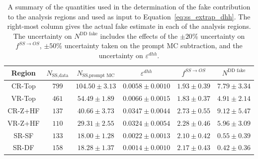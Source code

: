 \begin{table}[!htb]
    \begin{center}
    \caption{
        A summary of the quantities used in the determination of the fake contribution to the
        analysis regions and used as input to Equation~\ref{eq:ss_extrap_dhh}. The right-most
        column gives the actual fake estimate in each of the analysis regions. The uncertainty
        on $N^{\text{DD fake}}$ includes the effects of the $\pm20$\% uncertainty on
        $f^{SS \rightarrow OS}$, $\pm50$\% uncertainty taken on the prompt MC subtraction, and the
        uncertainty on $\varepsilon^{dhh}$.
    }
    \label{tab:hh_fake_quant}
    \begin{tabular}{c | c c c c || c}
    \hline
    \textbf{Region} & \textbf{$N_{\text{SS,data}}$} & \textbf{$N_{\text{SS,prompt MC}}$} & \textbf{$\varepsilon^{dhh}$} & \textbf{$f^{SS \rightarrow OS}$} & \textbf{$N^{\text{DD fake}} $} \\
    \hline
    CR-Top  & $799$ & $104.50 \pm 3.13$ & $ 0.0058 \pm 0.0010$ & $1.93 \pm 0.39$   & $7.79 \pm 3.34$ \\
    VR-Top  & $461$ & $54.49 \pm 1.89$  & $ 0.0066 \pm 0.0015$ & $1.83 \pm 0.37$   &  $4.91 \pm 2.14$ \\
    CR-Z+HF & $137$ & $40.66 \pm 3.73$  & $ 0.0347 \pm 0.0044$ & $2.73 \pm 0.55$   & $9.12 \pm 5.47$ \\
    VR-Z+HF & $110$ & $29.31 \pm 2.55$  & $ 0.0324 \pm 0.0054$ & $2.28 \pm 0.46$   &  $5.96 \pm 3.09$\\
    \hdashline
    SR-SF   & $133$ & $18.00 \pm 1.28$  & $ 0.0022 \pm 0.0013 $ & $2.10 \pm 0.42$  &  $0.55 \pm 0.39$\\
    SR-DF   & $158$ & $18.28 \pm 1.37$  & $ 0.0014 \pm 0.0010 $ &  $2.17 \pm 0.43$ &  $0.42 \pm 0.36$\\
    \hline
    \end{tabular}
    \end{center}
\end{table}

%
%

